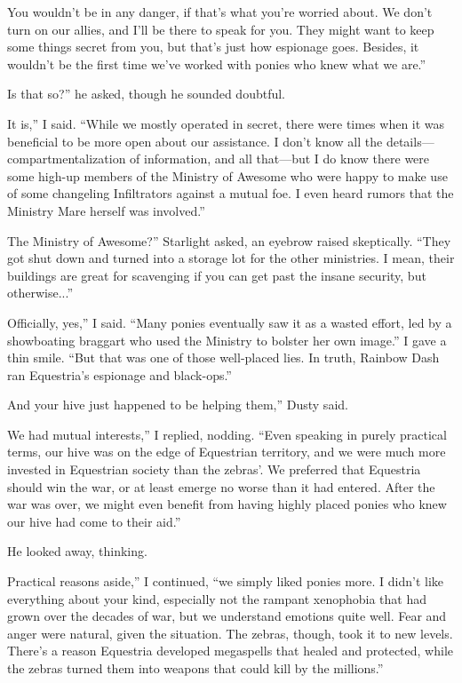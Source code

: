 \leavevmode{}You wouldn’t be in any danger, if that’s what you’re worried about. We don’t turn on our allies, and I’ll be there to speak for you. They might want to keep some things secret from you, but that’s just how espionage goes. Besides, it wouldn’t be the first time we’ve worked with ponies who knew what we are.”

\leavevmode{}Is that so?” he asked, though he sounded doubtful.

\leavevmode{}It is,” I said. “While we mostly operated in secret, there were times when it was beneficial to be more open about our assistance. I don’t know all the details—compartmentalization of information, and all that—but I do know there were some high-up members of the Ministry of Awesome who were happy to make use of some changeling Infiltrators against a mutual foe. I even heard rumors that the Ministry Mare herself was involved.”

\leavevmode{}The Ministry of Awesome?” Starlight asked, an eyebrow raised skeptically. “They got shut down and turned into a storage lot for the other ministries. I mean, their buildings are great for scavenging if you can get past the insane security, but otherwise...”

\leavevmode{}Officially, yes,” I said. “Many ponies eventually saw it as a wasted effort, led by a showboating braggart who used the Ministry to bolster her own image.” I gave a thin smile. “But that was one of those well-placed lies. In truth, Rainbow Dash ran Equestria's espionage and black-ops.”

\leavevmode{}And your hive just happened to be helping them,” Dusty said.

\leavevmode{}We had mutual interests,” I replied, nodding. “Even speaking in purely practical terms, our hive was on the edge of Equestrian territory, and we were much more invested in Equestrian society than the zebras’. We preferred that Equestria should win the war, or at least emerge no worse than it had entered. After the war was over, we might even benefit from having highly placed ponies who knew our hive had come to their aid.”

He looked away, thinking.

\leavevmode{}Practical reasons aside,” I continued, “we simply liked ponies more. I didn’t like everything about your kind, especially not the rampant xenophobia that had grown over the decades of war, but we understand emotions quite well. Fear and anger were natural, given the situation. The zebras, though, took it to new levels. There’s a reason Equestria developed megaspells that healed and protected, while the zebras turned them into weapons that could kill by the millions.”

